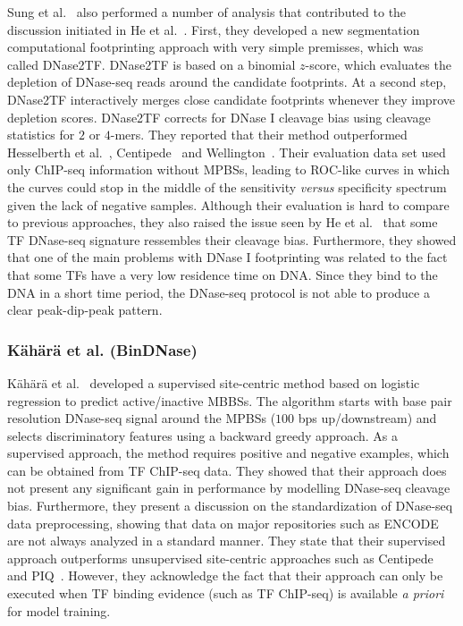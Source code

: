 Sung et al.~\cite{sung2014} also performed a number of analysis that contributed to the discussion initiated in He et al.~\cite{he2014}. First, they developed a new segmentation computational footprinting approach with very simple premisses, which was called DNase2TF. DNase2TF is based on a binomial $z$-score, which evaluates the depletion of DNase-seq reads around the candidate footprints. At a second step, DNase2TF interactively merges close candidate footprints whenever they improve depletion scores. DNase2TF corrects for DNase I cleavage bias using cleavage statistics for $2$ or $4$-mers. They reported that their method outperformed Hesselberth et al.~\cite{hesselberth2009}, Centipede~\cite{pique2011} and Wellington~\cite{piper2013}. Their evaluation data set used only ChIP-seq information without MPBSs, leading to ROC-like curves in which the curves could stop in the middle of the sensitivity \emph{versus} specificity spectrum given the lack of negative samples. Although their evaluation is hard to compare to previous approaches, they also raised the issue seen by He et al.~\cite{he2014} that some TF DNase-seq signature ressembles their cleavage bias. Furthermore, they showed that one of the main problems with DNase I footprinting was related to the fact that some TFs have a very low residence time on DNA. Since they bind to the DNA in a short time period, the DNase-seq protocol is not able to produce a clear peak-dip-peak pattern.

\subsubsection{K\"{a}h\"{a}r\"{a} et al. (BinDNase)}
\label{sec:kahara.2}

K\"{a}h\"{a}r\"{a} et al.~\cite{kahara2015} developed a supervised site-centric method based on logistic regression to predict active/inactive MBBSs. The algorithm starts with base pair resolution DNase-seq signal around the MPBSs ($100$ bps up/downstream) and selects discriminatory features using a backward greedy approach. As a supervised approach, the method requires positive and negative examples, which can be obtained from TF ChIP-seq data. They showed that their approach does not present any significant gain in performance by modelling DNase-seq cleavage bias. Furthermore, they present a discussion on the standardization of DNase-seq data preprocessing, showing that data on major repositories such as ENCODE are not always analyzed in a standard manner. They state that their supervised approach outperforms unsupervised site-centric approaches such as Centipede~\cite{pique2011} and PIQ~\cite{sherwood2014}. However, they acknowledge the fact that their approach can only be executed when TF binding evidence (such as TF ChIP-seq) is available \emph{a priori} for model training.

